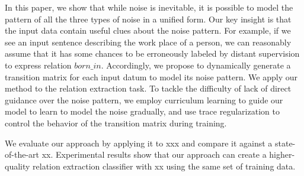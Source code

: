 In this paper, we show that while noise is inevitable, it is possible to model the pattern of all the three types of noise in a unified form. Our key insight is that the input data contain useful clues about the noise pattern. For example, if we see an input sentence describing the work place of a person, we can reasonably assume that it has some chances to be erroneously labeled by distant supervision to express relation $born\_in$. 
Accordingly, we propose to dynamically generate a transition matrix for each input datum to model its noise pattern. We apply our method to the relation extraction task. To tackle the difficulty of lack of direct guidance over the noise pattern, we employ curriculum learning to guide our model to learn to model the noise gradually, and use trace regularization to control the behavior of the transition matrix during training. %

We evaluate our approach by applying it to xxx and compare it against a
state-of-the-art xx. Experimental results show that our approach can create a
higher-quality relation extraction classifier with xx%
using the same set of training data.
